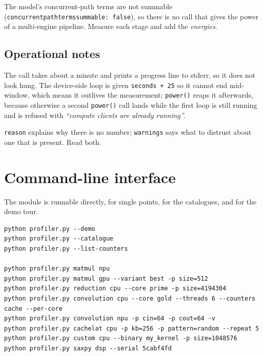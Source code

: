 \documentclass[11pt,a4paper]{article}
\newcommand{\code}[1]{\texttt{\let\_\breakableunderscore #1}}
\newcommand{\breakableunderscore}{\textunderscore\allowbreak}
\begin{document}
The model's concurrent-path terms are not summable
(\code{concurrent\_path\_terms\_summable: false}), so there is no call that
gives the power of a multi-engine pipeline. Measure each stage and add the
\emph{energies}.

\subsection{Operational notes}

The call takes about a minute and prints a progress line to stderr, so it does
not look hung. The device-side loop is given \code{seconds + 25} so it cannot
end mid-window, which means it outlives the measurement; \code{power()} reaps
it afterwards, because otherwise a second \code{power()} call lands while the
first loop is still running and is refused with \emph{``compute clients are
already running''}.

\code{reason} explains why there is no number; \code{warnings} says what to
distrust about one that is present. Read both.

\section{Command-line interface}

The module is runnable directly, for single points, for the catalogues, and for
the demo tour.

\begin{lstlisting}[style=sh]
python profiler.py --demo
python profiler.py --catalogue
python profiler.py --list-counters

python profiler.py matmul npu
python profiler.py matmul gpu --variant best -p size=512
python profiler.py reduction cpu --core prime -p size=4194304
python profiler.py convolution cpu --core gold --threads 6 --counters cache --per-core
python profiler.py convolution npu -p cin=64 -p cout=64 -v
python profiler.py cachelat cpu -p kb=256 -p pattern=random --repeat 5
python profiler.py custom cpu --binary my_kernel -p size=1048576
python profiler.py saxpy dsp --serial 5cabf4fd
\end{lstlisting}
\end{document}
